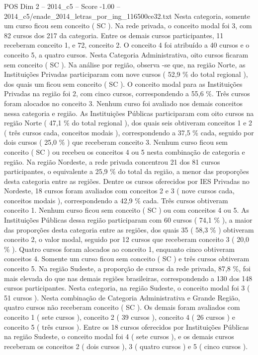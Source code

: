 \begin{textsample}{POS Dim 2 – 2014\_c5 – Score -1.00 – 2014\_c5/enade\_2014\_letras\_por\_ing\_116500ce32.txt}
Nesta categoria, somente um curso ficou sem conceito ( SC ).
Na rede privada, o conceito modal foi 3, com 82 cursos dos 217 da categoria.
Entre os demais cursos participantes, 11 receberam conceito 1, e 72, conceito 2.
O conceito 4 foi atribuído a 40 cursos e o conceito 5, a quatro cursos.
Nesta Categoria Administrativa, oito cursos ficaram sem conceito ( SC ).
Na análise por região, observa -se que, na região Norte, as Instituições Privadas participaram com nove cursos ( 52,9 \% do total regional ), dos quais um ficou sem conceito ( SC ).
O conceito modal para as Instituições Privadas na região foi 2, com cinco cursos, correspondendo a 55,6 \%.
Três cursos foram alocados no conceito 3.
Nenhum curso foi avaliado nos demais conceitos nessa categoria e região.
As Instituições Públicas participaram com oito cursos na região Norte ( 47,1 \% do total regional ), dos quais seis obtiveram conceitos 1 e 2 ( três cursos cada, conceitos modais ), correspondendo a 37,5 \% cada, seguido por dois cursos ( 25,0 \% ) que receberam conceito 3.
Nenhum curso ficou sem conceito ( SC ) ou recebeu os conceitos 4 ou 5 nesta combinação de categoria e região.
Na região Nordeste, a rede privada concentrou 21 dos 81 cursos participantes, o equivalente a 25,9 \% do total da região, a menor das proporções desta categoria entre as regiões.
Dentre os cursos oferecidos por IES Privadas no Nordeste, 18 cursos foram avaliados com conceitos 2 e 3 ( nove cursos cada, conceitos modais ), correspondendo a 42,9 \% cada.
Três cursos obtiveram conceito 1.
Nenhum curso ficou sem conceito ( SC ) ou com conceitos 4 ou 5.
As Instituições Públicas dessa região participaram com 60 cursos ( 74,1 \% ), a maior das proporções desta categoria entre as regiões, dos quais 35 ( 58,3 \% ) obtiveram conceito 2, o valor modal, seguido por 12 cursos que receberam conceito 3 ( 20,0 \% ).
Quatro cursos foram alocados ao conceito 1, enquanto cinco obtiveram conceitos 4.
Somente um curso ficou sem conceito ( SC ) e três cursos obtiveram conceito 5.
Na região Sudeste, a proporção de cursos da rede privada, 87,8 \%, foi mais elevada do que nas demais regiões brasileiras, correspondendo a 130 dos 148 cursos participantes.
Nesta categoria, na região Sudeste, o conceito modal foi 3 ( 51 cursos ).
Nesta combinação de Categoria Administrativa e Grande Região, quatro cursos não receberam conceito ( SC ).
Os demais foram avaliados com conceito 1 ( sete cursos ), conceito 2 ( 39 cursos ), conceito 4 ( 26 cursos ) e conceito 5 ( três cursos ).
Entre os 18 cursos oferecidos por Instituições Públicas na região Sudeste, o conceito modal foi 4 ( sete cursos ), e os demais cursos receberam os conceitos 2 ( dois cursos ), 3 ( quatro cursos ) e 5 ( cinco cursos ).

\end{textsample}

